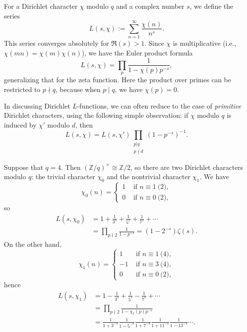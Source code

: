 \documentclass[reqno]{amsart}  \numberwithin{theorem}{section} \numberwithin{equation}{section}
\begin{document}
For a Dirichlet character $\chi$ modulo $q$ and a complex number $s$, we define the series
\begin{equation*}
L(s,\chi) := \sum_{n = 1 }^\infty \frac{\chi (n) }{ n^s}.
\end{equation*}
This series converges absolutely for $\Re(s) > 1$.  Since $\chi$ is multiplicative (i.e., $\chi (m n) = \chi (m) \chi (n)$), we have the Euler product formula
\begin{equation}\label{eq:cj579fpqu8}
L (s, \chi ) = \prod_p \frac{1}{1 - \chi (p) p^{- s}},
\end{equation}
generalizing that for the zeta function.  Here the product over primes can be restricted to $p \nmid q$, because when $p \mid q$, we have $\chi (p) = 0$.

In discussing Dirichlet $L$-functions, we can often reduce to the case of \emph{primitive} Dirichlet characters, using the following simple observation: if $\chi$ modulo $q$ is induced by $\chi '$ modulo $d$, then
\begin{equation*}
  L (s, \chi ) = L (s, \chi ') \prod_{
    \substack{
      p | q  \\
       p \nmid d
    }
  }
  (1 - p^{- s})^{-1}.
\end{equation*}
\begin{example}
  Suppose that $q = 4$.  Then $(\mathbb{Z} / q)^\times \cong \mathbb{Z} / 2$, so there are two Dirichlet characters modulo $q$: the trivial character $\chi_0$ and the nontrivial character $\chi_1$.  We have
  \begin{equation*}
\chi_0(n) =
\begin{cases}
1 &  \text{ if } n \equiv 1  \pod{2}, \\
0 & \text{ if } n \equiv 0 \pod{2},
\end{cases}
  \end{equation*}
  so
  \begin{align*}
    L(s,\chi_0) &= 1 + \frac{1}{ 3^s } + \frac{1}{5^s } + \frac{1}{7^s } + \dotsb \\
    &= \prod_{p \nmid 2} \frac{1}{1 - p^{- s}} = (1 - 2 ^{-s}) \zeta(s).
  \end{align*}
  On the other hand,
  \begin{equation*}
\chi_1 (n) =
\begin{cases}
1 & \text{ if } n \equiv 1 \pod{4}, \\
-1 & \text{ if } n \equiv 3 \pod{4}, \\
0 & \text{ if } n \equiv 0 \pod{2},
\end{cases}
  \end{equation*}
  hence
  \begin{align*}
    L (s, \chi_1 ) &= 1 - \frac{1}{3^s } + \frac{1}{5^s } - \frac{1}{7^s } + \dotsb \\
    &= \prod_{p \nmid 2} \frac{1}{1 - \chi_1(p) p^{- s}} \\
                   &= \frac{1}{1 + 3^{- s}}
                     \frac{1}{1 - 5^{- s}}
                     \frac{1}{1 + 7^{- s}} \frac{1}{1 + {11}^{- s}}
                     \frac{1}{1 - 13^{- s}} \dotsb.                     
\end{align*}
\end{example}
\end{document}
